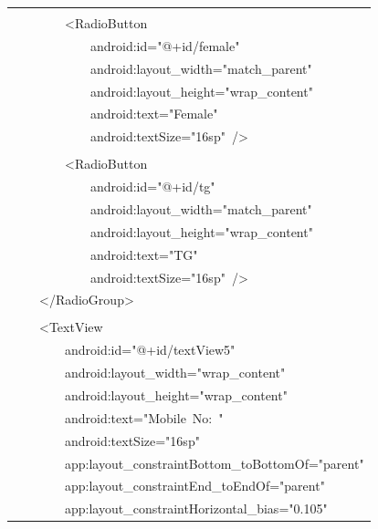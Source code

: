 \documentclass[a4paper,12pt]{article}
\begin{document}
\begin{longtable}{|p{}|}
\strut \\
{\ttfamily\small \ \ \ \ \ \ \ \ \textless{}RadioButton} \\
{\ttfamily\small \ \ \ \ \ \ \ \ \ \ \ \ android:id="@+id/female"} \\
{\ttfamily\small \ \ \ \ \ \ \ \ \ \ \ \ android:layout\_width="match\_parent"} \\
{\ttfamily\small \ \ \ \ \ \ \ \ \ \ \ \ android:layout\_height="wrap\_content"} \\
{\ttfamily\small \ \ \ \ \ \ \ \ \ \ \ \ android:text="Female"} \\
{\ttfamily\small \ \ \ \ \ \ \ \ \ \ \ \ android:textSize="16sp"\ /\textgreater{}} \\
\strut \\
{\ttfamily\small \ \ \ \ \ \ \ \ \textless{}RadioButton} \\
{\ttfamily\small \ \ \ \ \ \ \ \ \ \ \ \ android:id="@+id/tg"} \\
{\ttfamily\small \ \ \ \ \ \ \ \ \ \ \ \ android:layout\_width="match\_parent"} \\
{\ttfamily\small \ \ \ \ \ \ \ \ \ \ \ \ android:layout\_height="wrap\_content"} \\
{\ttfamily\small \ \ \ \ \ \ \ \ \ \ \ \ android:text="TG"} \\
{\ttfamily\small \ \ \ \ \ \ \ \ \ \ \ \ android:textSize="16sp"\ /\textgreater{}} \\
{\ttfamily\small \ \ \ \ \textless{}/RadioGroup\textgreater{}} \\
\strut \\
{\ttfamily\small \ \ \ \ \textless{}TextView} \\
{\ttfamily\small \ \ \ \ \ \ \ \ android:id="@+id/textView5"} \\
{\ttfamily\small \ \ \ \ \ \ \ \ android:layout\_width="wrap\_content"} \\
{\ttfamily\small \ \ \ \ \ \ \ \ android:layout\_height="wrap\_content"} \\
{\ttfamily\small \ \ \ \ \ \ \ \ android:text="Mobile\ No:\ "} \\
{\ttfamily\small \ \ \ \ \ \ \ \ android:textSize="16sp"} \\
{\ttfamily\small \ \ \ \ \ \ \ \ app:layout\_constraintBottom\_toBottomOf="parent"} \\
{\ttfamily\small \ \ \ \ \ \ \ \ app:layout\_constraintEnd\_toEndOf="parent"} \\
{\ttfamily\small \ \ \ \ \ \ \ \ app:layout\_constraintHorizontal\_bias="0.105"} \\

\end{longtable}
\end{document}
